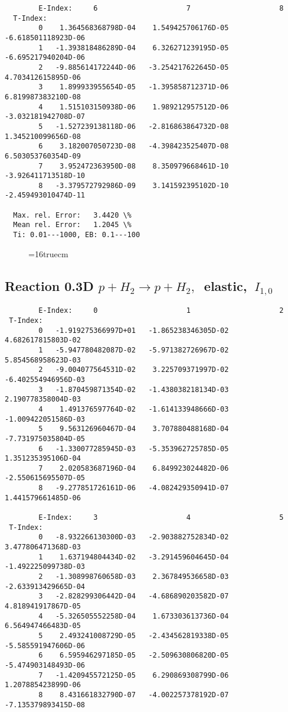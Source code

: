 \documentclass[12pt,dvipdfmx]{article}
\begin{document}
{\begin{small}
\begin{verbatim}
        E-Index:     6                     7                     8
  T-Index:
        0    1.364568368798D-04    1.549425706176D-05   -6.618501118923D-06
        1   -1.393818486289D-04    6.326271239195D-05   -6.695217940204D-06
        2   -9.885614172244D-06   -3.254217622645D-05    4.703412615895D-06
        3    1.899933955654D-05   -1.395858712371D-06    6.819987383210D-08
        4    1.515103150938D-06    1.989212957512D-06   -3.032181942708D-07
        5   -1.527239138118D-06   -2.816863864732D-08    1.345210099656D-08
        6    3.182007050723D-08   -4.398423525407D-08    6.503053760354D-09
        7    3.952472363950D-08    8.350979668461D-10   -3.926411713518D-10
        8   -3.379572792986D-09    3.141592395102D-10   -2.459493010474D-11

  Max. rel. Error:   3.4420 \%
  Mean rel. Error:   1.2045 \%
  Ti: 0.01---1000, EB: 0.1---100
\end{verbatim}\end{small}

\begin{figure} \label{0.3T}
\epsfxsize=16truecm
\end{figure}
\newpage


\subsection{
Reaction 0.3D  $p + H_2 \rightarrow  p + H_2 ,\ $  elastic,
$\  I_{1,0}$
}

\begin{small}\begin{verbatim}
        E-Index:     0                     1                     2
 T-Index:
        0   -1.919275366997D+01   -1.865238346305D-02    4.682617815803D-02
        1   -5.947780482087D-02   -5.971382726967D-02    5.854568958623D-03
        2   -9.004077564531D-02    3.225709371997D-02   -6.402554946956D-03
        3   -1.870459871354D-02   -1.438038218134D-03    2.190778358004D-03
        4    1.491376597764D-02   -1.614133948666D-03   -1.009422051586D-03
        5    9.563126960467D-04    3.707880488168D-04   -7.731975035804D-05
        6   -1.330077285945D-03   -5.353962725785D-05    1.351235395106D-04
        7    2.020583687196D-04    6.849923024482D-06   -2.550615695507D-05
        8   -9.277851726161D-06   -4.082429350941D-07    1.441579661485D-06

        E-Index:     3                     4                     5
 T-Index:
        0   -8.932266130300D-03   -2.903882752834D-02    3.477806471368D-03
        1    1.637194804434D-02   -3.291459604645D-04   -1.492225099738D-03
        2   -1.308998760658D-03    2.367849536658D-03   -2.633913429665D-04
        3   -2.828299306442D-04   -4.686890203582D-07    4.818941917867D-05
        4   -5.326505552258D-04    1.673303613736D-04    6.564947466483D-05
        5    2.493241008729D-05   -2.434562819338D-05   -5.585591947606D-06
        6    6.595946297185D-05   -2.509630806820D-05   -5.474903148493D-06
        7   -1.420945572125D-05    6.290869308799D-06    1.207885423899D-06
        8    8.431661832790D-07   -4.002257378192D-07   -7.135379893415D-08


\end{verbatim}
\end{small}}
\end{document}
